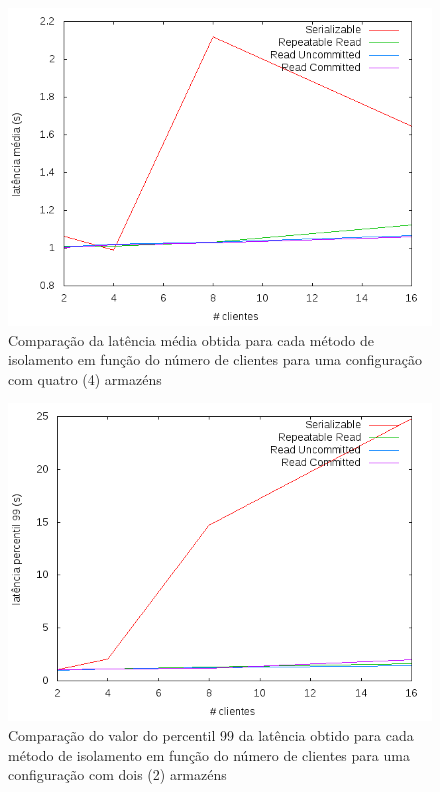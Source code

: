 \begin{figure}[!h]
\centering
\includegraphics[scale=.5]{img/questao-1/diff-lat-med-4-arm}
\caption{Comparação da latência média obtida para cada método de isolamento em função do número de clientes para uma configuração com quatro (4) armazéns}
\end{figure}

\newpage

\begin{figure}[!h]
\centering
\includegraphics[scale=.5]{img/questao-1/diff-lat-pct99-2-arm}
\caption{Comparação do valor do percentil 99 da latência obtido para cada método de isolamento em função do número de clientes para uma configuração com dois (2) armazéns}
\end{figure}

